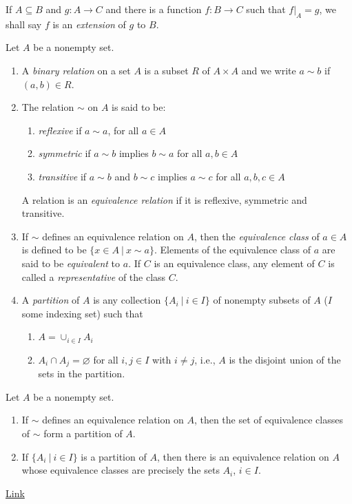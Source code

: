 If $A\subseteq B$ and $g:A\to C$ and there is a function $f:B\to C$ such that $f|_{A}=g$, we shall say $f$ is an {\sl extension} of $g$ to $B$.
{Let $A$ be a nonempty set.
\begin{enumerate}[leftmargin=20pt, itemsep=0pt, topsep=3pt]
    \item A {\sl binary relation} on a set $A$ is a subset $R$ of $A\times A$ and we write $a\sim b$ if $(a,b)\in R$.
    \item The relation $\sim$ on $A$ is said to be:
    \begin{enumerate}[leftmargin=20pt, itemsep=0pt, topsep=0pt, label=(\alph*)]
        \item {\sl reflexive} if $a\sim a$, for all $a\in A$
        \item {\sl symmetric} if $a\sim b$ implies $b\sim a$ for all $a,b\in A$
        \item {\sl transitive} if $a\sim b$ and $b\sim c$ implies $a\sim c$ for all $a,b,c\in A$
    \end{enumerate}
    A relation is an {\sl equivalence relation} if it is reflexive, symmetric and transitive.
    \item If $\sim$ defines an equivalence relation on $A$, then the {\sl equivalence class} of $a\in A$ is defined
    to be $\{x\in A\ |\ x\sim a\}$. Elements of the equivalence class of $a$ are said to be {\sl equivalent} to $a$.
    If $C$ is an equivalence class, any element of $C$ is called a {\sl representative} of the class $C$.
    \item A {\sl partition} of $A$ is any collection $\{A_{i}\ |\ i\in I\}$ of nonempty subsets of $A$ ($I$ some indexing set)
    such that
    \begin{enumerate}[leftmargin=20pt, itemsep=0pt, topsep=0pt, label=(\alph*)]
        \item $A = \cup_{i\in I}A_{i}$
        \item $A_{i} \cap A_{j} = \varnothing$ for all $i,j\in I$ with $i\neq j$, i.e.,
        $A$ is the disjoint union of the sets in the partition.
    \end{enumerate}
\end{enumerate}
}
\newpage
\thispagestyle{evenpagestyle}
{Let $A$ be a nonempty set.
\begin{enumerate}[leftmargin=20pt, itemsep=0pt, topsep=3pt]
    \item If $\sim$ defines an equivalence relation on $A$, then the set of equivalence classes of $\sim$ form a partition of $A$.
    \item If $\{A_{i}\ |\ i\in I\}$ is a partition of $A$, then there is an equivalence relation on $A$ whose equivalence classes are precisely the sets $A_{i}$, $i\in I$.
\end{enumerate}}
{
\href{https://math.libretexts.org/Courses/Monroe\_Community\_College/MTH\_220\_Discrete\_Math/6\%3A\_Relations/6.3\%3A\_Equivalence\_Relations\_and\_Partitions}
{Link}
}

